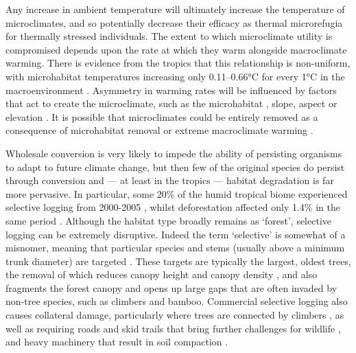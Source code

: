 \documentclass[12pt,a4paper,]{report}
\theoremstyle{definition}
\theoremstyle{definition}
\theoremstyle{definition}
\theoremstyle{remark}
\begin{document}
Any increase in ambient temperature will ultimately increase the
temperature of microclimates, and so potentially decrease their efficacy
as thermal microrefugia for thermally stressed individuals. The extent
to which microclimate utility is compromised depends upon the rate at
which they warm alongside macroclimate warming. There is evidence from
the tropics that this relationship is non-uniform, with microhabitat
temperatures increasing only 0.11--0.66°C for every 1°C in the
macroenvironment \citep{scheffers_microhabitats2014}. Asymmetry in
warming rates will be influenced by factors that act to create the
microclimate, such as the microhabitat
\citep{scheffers_microhabitats2014}, slope, aspect or elevation
\citep{suggitt_habitat2011}. It is possible that microclimates could be
entirely removed as a consequence of microhabitat removal
\citep[e.g.~loss of some bird's nest fern species upon conversion of
forest to oil palm plantation;][]{fayle_effect2009} or extreme
macroclimate warming \citep{caillon_warming2014}.

Wholesale conversion is very likely to impede the ability of persisting
organisms to adapt to future climate change, but then few of the
original species do persist through conversion
\citep[e.g.][]{gibson_primary2011, katovai_understory2012, murphy_meta-analysis2014}
and --- at least in the tropics --- habitat degradation is far more
pervasive. In particular, some 20\% of the humid tropical biome
experienced selective logging from 2000-2005
\citep{asner_contemporary2009}, whilst deforestation affected only 1.4\%
in the same period \citep{hansen_humid2008}. Although the habitat type
broadly remains as `forest', selective logging can be extremely
disruptive. Indeed the term `selective' is somewhat of a misnomer,
meaning that particular species and stems (usually above a minimum trunk
diameter) are targeted \citep{edwards_maintaining2014}. These targets
are typically the largest, oldest trees, the removal of which reduces
canopy height and canopy density
\citep{kumar_effects2005, okuda_effect2003}, and also fragments the
forest canopy and opens up large gaps \citep{edwards_maintaining2014}
that are often invaded by non-tree species, such as climbers and bamboo.
Commercial selective logging also causes collateral damage, particularly
where trees are connected by climbers \citep{schnitzer_recruitment2004},
as well as requiring roads and skid trails that bring further challenges
for wildlife \citep{brodie_correlation2014, laurance_global2014}, and
heavy machinery that result in soil compaction
\citep{putz_reduced-impact2008}.
\end{document}
